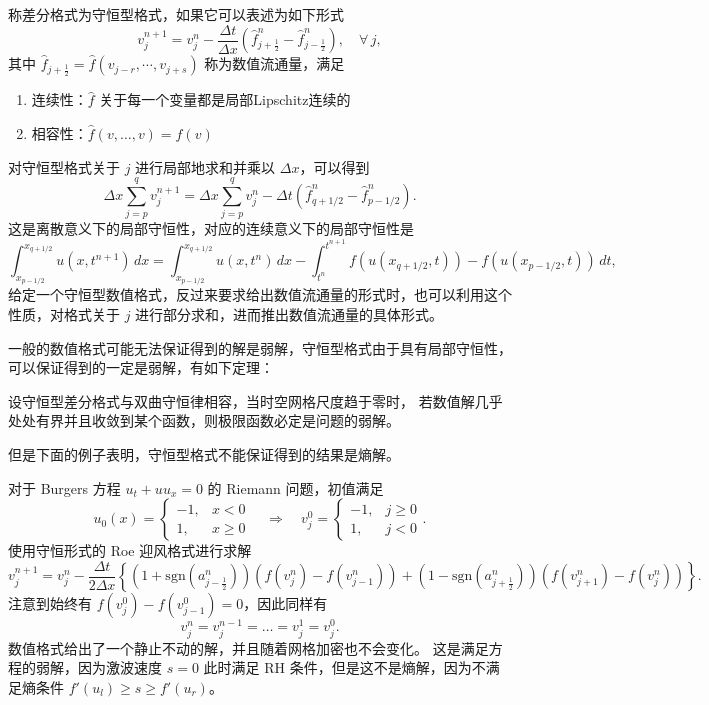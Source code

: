 \begin{definition}[守恒型格式]
    称差分格式为守恒型格式，如果它可以表述为如下形式
    \[
        v_{j}^{n+1} = v_j^n - \frac{\Delta t}{\Delta x}\left(
        \hat{f}_{j+\frac12}^n - \hat{f}_{j-\frac12}^n
        \right),\quad \forall\,j,
    \]
    其中 $\hat{f}_{j+\frac12} = \hat{f}(v_{j-r},\cdots,v_{j+s})$ 称为数值流通量，满足
    \begin{enumerate}
        \item 连续性：$\hat{f}$ 关于每一个变量都是局部Lipschitz连续的
        \item 相容性：$\hat{f}(v,\dots,v) = f(v)$
    \end{enumerate}
\end{definition}

对守恒型格式关于 $j$ 进行局部地求和并乘以 $\Delta x$，可以得到
\[
    \Delta x\sum_{j=p}^q v_j^{n+1}  = \Delta x\sum_{j=p}^q v_j^n  -  \Delta t
    \left(
    \hat{f}_{q+1/2}^n - \hat{f}_{p-1/2}^n
    \right).
\]
这是离散意义下的局部守恒性，对应的连续意义下的局部守恒性是
\[
    \int_{x_{p-1/2}}^{x_{q+1/2}} u(x,t^{n+1}) \,dx
    =
    \int_{x_{p-1/2}}^{x_{q+1/2}} u(x,t^n)\,dx
    - \int_{t^n}^{t^{n+1}} f(u(x_{q+1/2},t)) - f(u(x_{p-1/2},t))\,dt,
\]
给定一个守恒型数值格式，反过来要求给出数值流通量的形式时，也可以利用这个性质，对格式关于 $j$ 进行部分求和，进而推出数值流通量的具体形式。



一般的数值格式可能无法保证得到的解是弱解，守恒型格式由于具有局部守恒性，可以保证得到的一定是弱解，有如下定理：
\begin{theorem}
    设守恒型差分格式与双曲守恒律相容，当时空网格尺度趋于零时，
    若数值解几乎处处有界并且收敛到某个函数，则极限函数必定是问题的弱解。
\end{theorem}

但是下面的例子表明，守恒型格式不能保证得到的结果是熵解。

\begin{example}
    对于 Burgers 方程 $u_t + u u_x = 0$ 的 Riemann 问题，初值满足
    \[
        u_0(x) =
        \begin{cases}
            -1, & x < 0   \\
            1,  & x \ge 0
        \end{cases} \quad \Rightarrow \quad  v_j^0 =
        \begin{cases}
            -1, & j \ge 0 \\
            1,  & j < 0
        \end{cases}.
    \]
    使用守恒形式的 Roe 迎风格式进行求解
    \[
        v_j^{n+1} = v_j^n - \frac{\Delta t}{2\Delta x}
        \left\{
        (1+\text{sgn}(a_{j-\frac12}^n))(f(v_{j}^n)-f(v_{j-1}^n))
        + (1-\text{sgn}(a_{j+\frac12}^n))(f(v_{j+1}^n)-f(v_{j}^n))
        \right\}.
    \]
    注意到始终有 $f(v_{j}^0)-f(v_{j-1}^0) = 0$，因此同样有
    \[
        v_j^n = v_j^{n-1} = \dots = v_j^1 = v_j^0.
    \]
    数值格式给出了一个静止不动的解，并且随着网格加密也不会变化。
    这是满足方程的弱解，因为激波速度 $s = 0$ 此时满足 RH 条件，但是这不是熵解，因为不满足熵条件 $f'(u_l) \ge s \ge f'(u_r)$。
\end{example}


